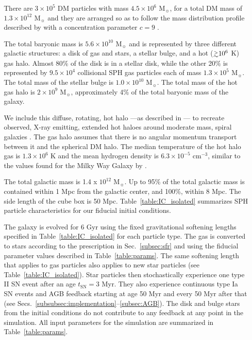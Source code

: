 \documentclass[iop]{emulateapj}
\newcommand{\gapprox }{{\lower0.8ex\hbox{$\buildrel >\over\sim$}}}
\begin{document}
There are $3\times 10^5$ DM particles with mass $4.5\times 10^6$ M$_{\sun}$, for a total DM mass of $1.3\times 10^{12}$ M$_{\sun}$ and they are arranged so as to follow the mass distribution profile described by \citet{Hernquist90} with a concentration parameter $c=9$ \citep{Navarro97}.

The total baryonic mass is $5.6\times 10^{10}$ M$_{\sun}$ and is represented by three different galactic structures: a disk of gas and stars, a stellar bulge, and a hot ($\gapprox10^6$ K) gas halo. Almost 80\% of the disk is in a stellar disk, while the other 20\% is represented by $9.5\times 10^4$ collisional SPH gas particles each of mass $1.3\times 10^5$ M$_{\sun}$. The total mass of the stellar bulge is $1.0\times 10^{10}$ M$_{\sun}$. The total mass of the hot gas halo is $2\times 10^{9}$ M$_{\sun}$, approximately 4\% of the total baryonic mass of the galaxy.

We include this diffuse, rotating, hot halo ---as described in \citet{Moster11} \citep[see also][]{Choi14}--- to recreate observed, X-ray emitting, extended hot haloes around moderate mass, spiral galaxies \citep{Anderson13}. The gas halo assumes that there is no angular momentum transport between it and the spherical DM halo. The median temperature of the hot halo gas is $1.3\times 10^6$ K and the mean hydrogen density is $6.3\times 10^{-5}$ cm$^{-3}$, similar to the values found for the Milky Way Galaxy by \citet{Faerman2016}.

The total galactic mass is 1.4 x $10^{12}$ M$_{\sun}$. Up to 95\% of the total galactic mass is contained within 1 Mpc from the galactic center, and 100\%, within 8 Mpc. The side length of the cube box is 50 Mpc. Table~\ref{table:IC_isolated} summarizes SPH particle characteristics for our fiducial initial conditions.



The galaxy is evolved for 6 Gyr using the fixed gravitational softening lengths specified in Table~\ref{table:IC_isolated} for each particle type. The gas is converted to stars according to the prescription in Sec.~\ref{subsec:sfr} and using the fiducial parameter values described in Table~\ref{table:params}. The same softening length that applies to gas particles also applies to new star particles (see Table~\ref{table:IC_isolated}). Star particles then stochastically experience one type II SN event after an age $t_{\mathrm{SN}}=3$ Myr. They also experience continuous type Ia SN events and AGB feedback starting at age 50 Myr and every 50 Myr after that (see Secs.~\ref{subsubsec:implementation}--\ref{subsec:AGB}). The disk and bulge stars from the initial conditions do not contribute to any feedback at any point in the simulation. All input parameters for the simulation are summarized in Table~\ref{table:params}.
\end{document}
